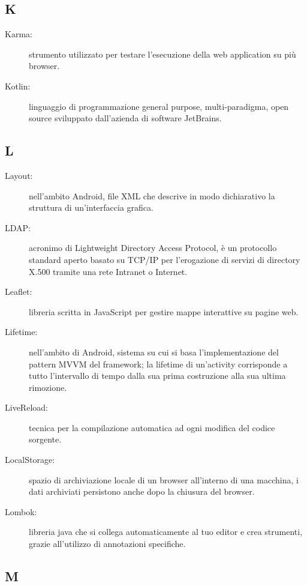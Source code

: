 \documentclass[../manuale-manutentore.tex]{subfiles}
\begin{document}
\subsection{K}

\begin{description}
    \item[Karma:] strumento utilizzato per testare l'esecuzione della web application su più browser.
    \item[Kotlin:] linguaggio di programmazione general purpose, multi-paradigma, open source sviluppato dall'azienda di software JetBrains.
\end{description}

\subsection{L}

\begin{description}
    \item[Layout:] nell'ambito Android, file XML che descrive in modo dichiarativo la struttura di un'interfaccia grafica.
    \item[LDAP:] acronimo di Lightweight Directory Access Protocol, è un protocollo standard aperto basato su TCP/IP per l’erogazione di servizi di directory X.500 tramite una rete Intranet o Internet.
    \item[Leaflet:] libreria scritta in JavaScript per gestire mappe interattive su pagine web.
    \item[Lifetime:] nell'ambito di Android, sistema su cui si basa l'implementazione del pattern MVVM del framework; la lifetime di un'activity corrisponde a tutto l'intervallo di tempo dalla sua prima costruzione alla sua ultima rimozione.
    \item[LiveReload:] tecnica per la compilazione automatica ad ogni modifica del codice sorgente.
    \item[LocalStorage:] spazio di archiviazione locale di un browser all'interno di una macchina, i dati archiviati persistono anche dopo la chiusura del browser.
    \item[Lombok:] libreria java che si collega automaticamente al tuo editor e crea strumenti, grazie all'utilizzo di annotazioni specifiche.
\end{description}

\subsection{M}
\end{document}
